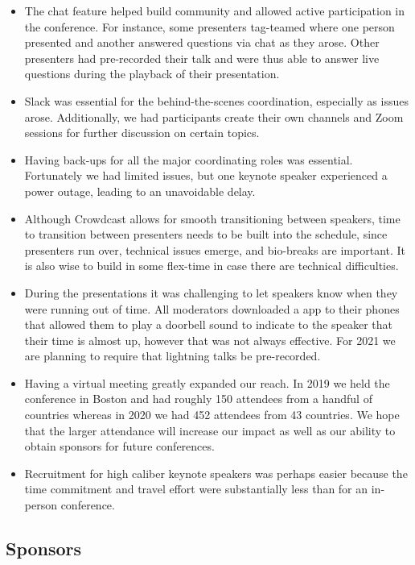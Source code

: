 \begin{itemize}
\item
  The chat feature helped build community and allowed active participation in the conference. For instance, some presenters tag-teamed where one person presented and another answered questions via chat as they arose. Other presenters had pre-recorded their talk and were thus able to answer live questions during the playback of their presentation.
\item
  Slack was essential for the behind-the-scenes coordination, especially as issues arose. Additionally, we had participants create their own channels and Zoom sessions for further discussion on certain topics.
\item
  Having back-ups for all the major coordinating roles was essential. Fortunately we had limited issues, but one keynote speaker experienced a power outage, leading to an unavoidable delay.
\item
  Although Crowdcast allows for smooth transitioning between speakers, time to transition between presenters needs to be built into the schedule, since presenters run over, technical issues emerge, and bio-breaks are important. It is also wise to build in some flex-time in case there are technical difficulties.
\item
  During the presentations it was challenging to let speakers know when they were running out of time. All moderators downloaded a app to their phones that allowed them to play a doorbell sound to indicate to the speaker that their time is almost up, however that was not always effective. For 2021 we are planning to require that lightning talks be pre-recorded.
\item
  Having a virtual meeting greatly expanded our reach. In 2019 we held the conference in Boston and had roughly 150 attendees from a handful of countries whereas in 2020 we had 452 attendees from 43 countries. We hope that the larger attendance will increase our impact as well as our ability to obtain sponsors for future conferences.
\item
  Recruitment for high caliber keynote speakers was perhaps easier because the time commitment and travel effort were substantially less than for an in-person conference.
\end{itemize}

\hypertarget{sponsors}{%
\subsection{Sponsors}\label{sponsors}}

